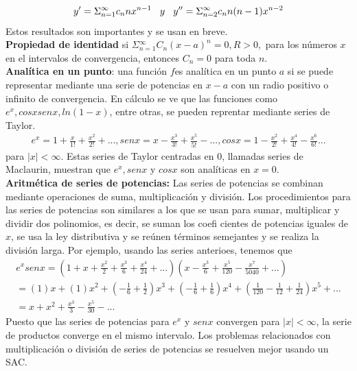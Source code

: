 \documentclass[12pt,letterpaper,oneside]{article}
\begin{document}
  \begin{align*}
  y'= \Sigma{^\infty_{n=1}} c_n nx^{n-1} \hspace{0.3cm}  y  \hspace{0.3cm}  y''= \Sigma{^\infty_{n=2}} c_nn(n-1)x^{n-2}
  \end{align*}
 Estos resultados son importantes y se usan en breve.\vspace{0.3cm}\\
 \textbf{Propiedad de identidad} si $\Sigma{^\infty_{n=1}} C_n(x-a)^n = 0, R>0,$ para los números $x$ en el intervalos de convergencia, entonces $C_n = 0$ para toda $n$.\vspace{0.3cm}\\
 \textbf{Analítica en un punto}: una función $f$es analítica en un punto $a$ si se puede representar mediante una serie de potencias en $x - a$ con un radio positivo o infinito de convergencia. En cálculo se ve que las funciones como $e^x, cos x sen x, ln(1 - x)$, entre otras, se pueden reprentar mediante series de Taylor.\\
 \begin{align*}
 e^x = 1 + \frac{x}{1!} + \frac{x^2}{2!} +..., sen x = x- \frac{x^3}{3!} + \frac{x^5}{5!} -..., cos x = 1 - \frac{x^2}{2!} + \frac{x^4}{4!} - \frac{x^6}{6!}...
 \end{align*}
 para $|x|<\infty.$ Estas series de Taylor centradas en 0, llamadas series de Maclaurin, muestran que $e^x, sen x$ y $cos x$ son analíticas en $x = 0$.\vspace{0.3cm}\\
\textbf{Aritmética de series de potencias:} Las series de potencias se combinan
mediante operaciones de suma, multiplicación y división. Los procedimientos
para las series de potencias son similares a los que se usan para sumar,
multiplicar y dividir dos polinomios, es decir, se suman los coefi cientes de
potencias iguales de $x$, se usa la ley distributiva y se reúnen términos semejantes
y se realiza la división larga. Por ejemplo, usando las series anterioes, tenemos que\\
\begin{align*}
e^x sen x = \left(1 + x + \frac{x^2}{2} + \frac{x^3}{6} + \frac{x^4}{24} + ... \right)\left(x - \frac{x^3}{6} +\frac{x^5}{120} - \frac{x^7}{5040} + ... \right)\\
= (1)x + (1)x^2 + \left( - \frac{1}{6} + \frac{1}{2} \right)x^3 + \left( - \frac{1}{6} + \frac{1}{6} \right)x^4 + \left( \frac{1}{120} - \frac{1}{12} +\frac{1}{24} \right)x^5 + ...\\
=x + x^2 + \frac{x^3}{3} - \frac{x^5}{30} - ...
\end{align*}
Puesto que las series de potencias para $e^x$ y $sen x$ convergen para $|x|<\infty$, la serie de productos converge en el mismo intervalo. Los problemas relacionados con multiplicación o división de series de potencias se resuelven mejor usando un SAC.\\
\end{document}
